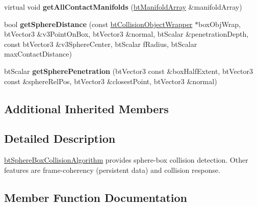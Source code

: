 \begin{DoxyCompactItemize}
\item 
\mbox{\label{classbtSphereBoxCollisionAlgorithm_ac506db81f3885ed079b902817a6d7803}} 
virtual void {\bfseries get\+All\+Contact\+Manifolds} (\hyperlink{classbtAlignedObjectArray}{bt\+Manifold\+Array} \&manifold\+Array)
\item 
\mbox{\label{classbtSphereBoxCollisionAlgorithm_a84fb21901c8dbbf9c8fca70ac173721f}} 
bool {\bfseries get\+Sphere\+Distance} (const \hyperlink{structbtCollisionObjectWrapper}{bt\+Collision\+Object\+Wrapper} $\ast$box\+Obj\+Wrap, bt\+Vector3 \&v3\+Point\+On\+Box, bt\+Vector3 \&normal, bt\+Scalar \&penetration\+Depth, const bt\+Vector3 \&v3\+Sphere\+Center, bt\+Scalar f\+Radius, bt\+Scalar max\+Contact\+Distance)
\item 
\mbox{\label{classbtSphereBoxCollisionAlgorithm_ab6566f6aa866da47034cb976fe1276a4}} 
bt\+Scalar {\bfseries get\+Sphere\+Penetration} (bt\+Vector3 const \&box\+Half\+Extent, bt\+Vector3 const \&sphere\+Rel\+Pos, bt\+Vector3 \&closest\+Point, bt\+Vector3 \&normal)
\end{DoxyCompactItemize}
\subsection*{Additional Inherited Members}


\subsection{Detailed Description}
\hyperlink{classbtSphereBoxCollisionAlgorithm}{bt\+Sphere\+Box\+Collision\+Algorithm} provides sphere-\/box collision detection. Other features are frame-\/coherency (persistent data) and collision response. 

\subsection{Member Function Documentation}
\mbox{\label{classbtSphereBoxCollisionAlgorithm_ab171b2afeabaaaa8a51728426643c369}} 
